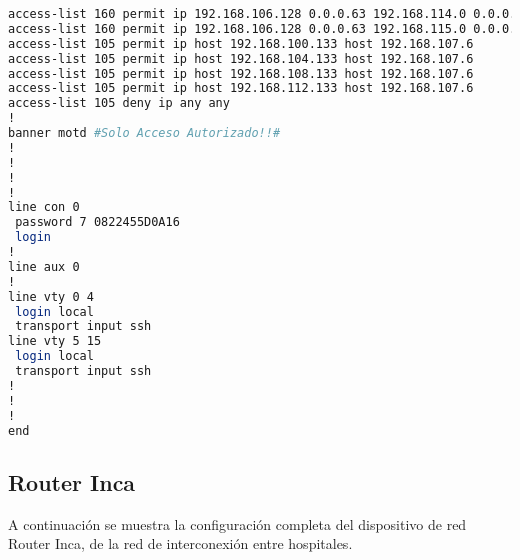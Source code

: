 \begin{lstlisting}[language=Bash, caption={Configuración Completa Router Manacor}]
access-list 160 permit ip 192.168.106.128 0.0.0.63 192.168.114.0 0.0.0.255
access-list 160 permit ip 192.168.106.128 0.0.0.63 192.168.115.0 0.0.0.127
access-list 105 permit ip host 192.168.100.133 host 192.168.107.6
access-list 105 permit ip host 192.168.104.133 host 192.168.107.6
access-list 105 permit ip host 192.168.108.133 host 192.168.107.6
access-list 105 permit ip host 192.168.112.133 host 192.168.107.6
access-list 105 deny ip any any
!
banner motd #Solo Acceso Autorizado!!#
!
!
!
!
line con 0
 password 7 0822455D0A16
 login
!
line aux 0
!
line vty 0 4
 login local
 transport input ssh
line vty 5 15
 login local
 transport input ssh
!
!
!
end


\end{lstlisting}

\subsection{Router Inca}
A continuación se muestra la configuración completa del dispositivo de red Router Inca, de la red de interconexión entre hospitales.
